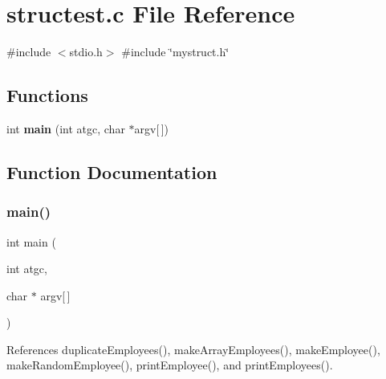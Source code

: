 \section{structest.\+c File Reference}
\label{structest_8c}
{\ttfamily \#include $<$stdio.\+h$>$}\newline
{\ttfamily \#include \char`\"{}mystruct.\+h\char`\"{}}\newline
\subsection*{Functions}
\begin{DoxyCompactItemize}
\item 
int \textbf{ main} (int atgc, char $\ast$argv[$\,$])
\end{DoxyCompactItemize}


\subsection{Function Documentation}
\mbox{\label{structest_8c_a5382d205c33bd6686f92c2e6e17dbffa}} 
\subsubsection{main()}
{\footnotesize\ttfamily int main (\begin{DoxyParamCaption}\item[{int}]{atgc,  }\item[{char $\ast$}]{argv[$\,$] }\end{DoxyParamCaption})}



References duplicate\+Employees(), make\+Array\+Employees(), make\+Employee(), make\+Random\+Employee(), print\+Employee(), and print\+Employees().

